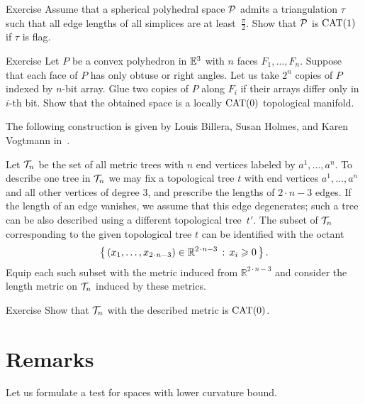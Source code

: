 \begin{thm}{Exercise}\label{ex:flag>=pi/2}
Assume that a spherical polyhedral space $\mathcal{P}$
admits a triangulation $\tau$ such that all edge lengths of all simplices are at least~$\tfrac\pi2$.
Show that $\mathcal{P}$ is $\mathrm{CAT}(1)$
if $\tau$ is flag.
\end{thm}

\begin{thm}{Exercise}\label{ex:polyhedron-glue}
Let $P$ be a convex polyhedron in $\mathbb{E}^3$ with $n$ faces $F_1,\dots, F_n$.
Suppose that each face of $P$ has only obtuse or right angles.
Let us take $2^n$ copies of $P$ indexed by $n$-bit array.
Glue two copies of $P$ along $F_i$ if their arrays differ only in $i$-th bit.
Show that the obtained space is a locally $\mathrm{CAT}(0)$ topological manifold.
\end{thm}

The following construction is given by
Louis Billera,
Susan Holmes,
and  Karen Vogtmann in~\cite{billera-holmes-vogtmann}.

Let $\mathcal{T}_n$ be the set of all metric trees with 
$n$ end vertices
labeled by $a^1,\dots,a^n$.
To describe one tree in $\mathcal{T}_n$ we may fix a topological tree $t$ with end vertices $a^1,\dots,a^n$ 
and all  other vertices of degree 3,  
and prescribe the lengths of $2\cdot n-3$ edges.
If the length of an edge vanishes, we assume that this edge degenerates;
such a tree can be also described using a different topological tree~$t'$.
The subset of $\mathcal{T}_n$ corresponding to the given topological tree $t$ can be identified with the octant
\[\set{(x_1,\dots,x_{2\cdot n-3})\in\mathbb{R}^{2\cdot n-3}}{x_i\ge 0}.\]
Equip each such subset with the metric induced from $\mathbb{R}^{2\cdot n-3}$ and consider the length metric on $\mathcal{T}_n$ induced by these metrics.

\begin{thm}{Exercise}\label{ex:tree}
Show that $\mathcal{T}_n$ with the described metric is $\mathrm{CAT}(0)$.
\end{thm}

\section{Remarks}

Let us formulate a test for spaces with lower curvature bound.

